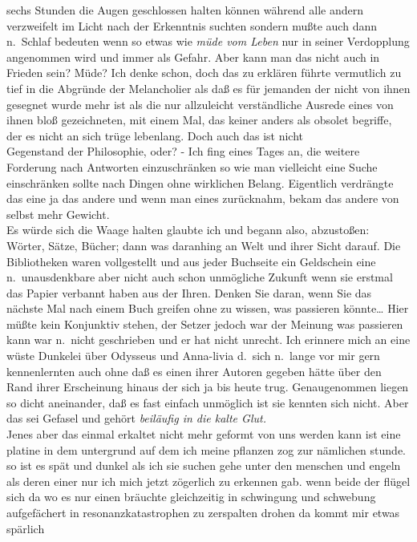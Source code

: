 \documentclass[
]{article}
\begin{document}
sechs Stunden die Augen geschlossen halten können während alle andern
verzweifelt im Licht nach der Erkenntnis suchten sondern mußte auch dann
n.~Schlaf bedeuten wenn so etwas wie \emph{müde vom Leben} nur in seiner
Verdopplung angenommen wird und immer als Gefahr. Aber kann man das
nicht auch in Frieden sein? Müde? Ich denke schon, doch das zu erklären
führte vermutlich zu tief in die Abgründe der Melancholier als daß es
für jemanden der nicht von ihnen gesegnet wurde mehr ist als die nur
allzuleicht verständliche Ausrede eines von ihnen bloß gezeichneten, mit
einem Mal, das keiner anders als obsolet begriffe, der es nicht an sich
trüge lebenlang. Doch auch das ist nicht\\
Gegenstand der Philosophie, oder? - Ich fing eines Tages an, die weitere
Forderung nach Antworten einzuschränken so wie man vielleicht eine Suche
einschränken sollte nach Dingen ohne wirklichen Belang. Eigentlich
verdrängte das eine ja das andere und wenn man eines zurücknahm, bekam
das andere von selbst mehr Gewicht.\\
Es würde sich die Waage halten glaubte ich und begann also, abzustoßen:
Wörter, Sätze, Bücher; dann was daranhing an Welt und ihrer Sicht
darauf. Die Bibliotheken waren vollgestellt und aus jeder Buchseite ein
Geldschein eine n.~unausdenkbare aber nicht auch schon unmögliche
Zukunft wenn sie erstmal das Papier verbannt haben aus der Ihren. Denken
Sie daran, wenn Sie das nächste Mal nach einem Buch greifen ohne zu
wissen, was passieren könnte\ldots{} Hier müßte kein Konjunktiv stehen,
der Setzer jedoch war der Meinung was passieren kann war n.~nicht
geschrieben und er hat nicht unrecht. Ich erinnere mich an eine wüste
Dunkelei über Odysseus und Anna-livia d.~sich n.~lange vor mir gern
kennenlernten auch ohne daß es einen ihrer Autoren gegeben hätte über
den Rand ihrer Erscheinung hinaus der sich ja bis heute trug.
Genaugenommen liegen so dicht aneinander, daß es fast einfach unmöglich
ist sie kennten sich nicht. Aber das sei Gefasel und gehört
\emph{beiläufig in die kalte Glut.}\\
Jenes aber das einmal erkaltet nicht mehr geformt von uns werden kann
ist eine platine in dem untergrund auf dem ich meine pflanzen zog zur
nämlichen stunde. so ist es spät und dunkel als ich sie suchen gehe
unter den menschen und engeln als deren einer nur ich mich jetzt
zögerlich zu erkennen gab. wenn beide der flügel sich da wo es nur einen
bräuchte gleichzeitig in schwingung und schwebung aufgefächert in
resonanzkatastrophen zu zerspalten drohen da kommt mir etwas spärlich
\end{document}
